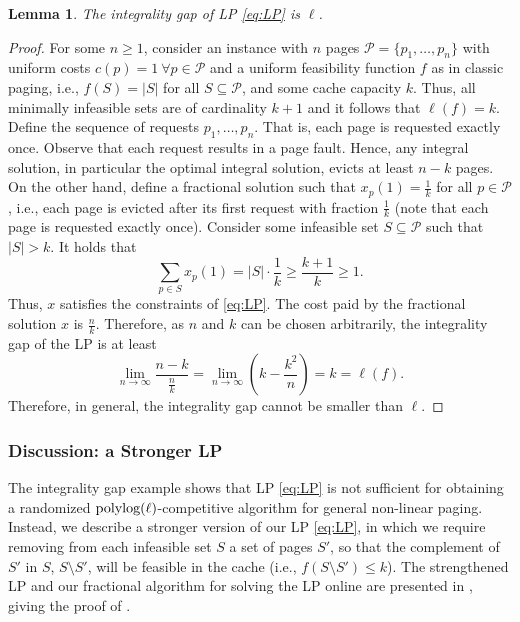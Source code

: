 \documentclass[11pt]{article}
\newcommand{\cP}{{\mathcal{P}}}
\newtheorem{lemma}[thm]{Lemma}
\begin{document}
\begin{lemma}
    \label{lem:integralityGap}
    The integrality gap of \textnormal{LP} \eqref{eq:LP} is $\ell$. 
\end{lemma}
\begin{proof}
For some $n \geq 1$, consider an instance with $n$ pages $\cP = \{p_1,\ldots, p_n\}$ with uniform costs $c(p) = 1~\forall p \in \cP$ and a uniform feasibility function $f$ as in classic paging, i.e.,  $f(S) = |S|$ for all $S \subseteq \cP$, and some cache capacity $k$. Thus, all minimally infeasible sets are of cardinality $k+1$ and it follows that $\ell(f) = k$. Define the sequence of requests $p_1,\ldots, p_n$. That is, each page is requested exactly once. Observe that each request results in a page fault. Hence, any integral solution, in particular the optimal integral solution, evicts at least $n-k$ pages. On the other hand, define a fractional solution such that $x_p(1) = \frac{1}{k}$ for all $p \in \cP$, i.e., each page is evicted after its first request with fraction $\frac{1}{k}$ (note that each page is requested exactly once). Consider some infeasible set $S \subseteq \cP$ such that $|S| > k$. It holds that 
$$\sum_{p \in S} x_p(1) = |S| \cdot \frac{1}{k} \geq \frac{k+1}{k} \geq 1.$$
Thus, $x$ satisfies the constraints of \eqref{eq:LP}. The cost paid by the fractional solution $x$ is $\frac{n}{k}$. Therefore, as $n$ and $k$ can be chosen arbitrarily, the integrality gap of the LP is at least $$\lim_{n \rightarrow \infty} \frac{n-k}{\frac{n}{k}} = \lim_{n \rightarrow \infty} \left(k-\frac{k^2}{n}\right) = k = \ell(f).$$
    Therefore, in general, the integrality gap cannot be smaller than $\ell$.  
\end{proof}

\subsubsection{Discussion: a Stronger LP}
The integrality gap example shows that LP \eqref{eq:LP} is not sufficient for obtaining a randomized $\textnormal{polylog}(\ell)$-competitive algorithm for general non-linear paging. Instead, we describe a stronger version of our LP \eqref{eq:LP}, %
in which we require removing from each infeasible set $S$ a set of pages $S'$, so that the complement of $S'$ in $S$, $S \setminus S'$, will be feasible in the cache (i.e., $ f\left(S \setminus S'\right) \leq k$). The strengthened LP and our fractional algorithm for solving the LP online are presented in , giving the proof of . 
\end{document}
